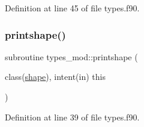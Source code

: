 Definition at line 45 of file types.\+f90.

\mbox{\label{namespacetypes__mod_ab09448209b0b127b46bc8fa8bf29b739}} 
\subsubsection{\texorpdfstring{printshape()}{printshape()}}
{\footnotesize\ttfamily subroutine types\+\_\+mod\+::printshape (\begin{DoxyParamCaption}\item[{class(\mbox{\hyperlink{structtypes__mod_1_1shape}{shape}}), intent(in)}]{this }\end{DoxyParamCaption})\hspace{0.3cm}{\ttfamily [private]}}



Definition at line 39 of file types.\+f90.


